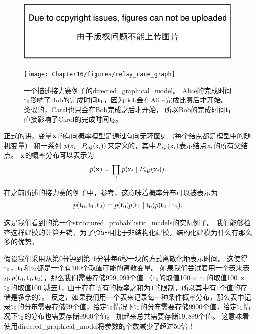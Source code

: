 \begin{figure}[!htb]
\ifOpenSource
\centerline{\includegraphics{figure.pdf}}
\else
\centerline{\texttt{[image: Chapter16/figures/relay\_race\_graph]}}	
\fi
\caption{一个描述接力赛例子的\gls{directed_graphical_model}。
Alice的完成时间$\mathrm{t}_0$影响了Bob的完成时间$\mathrm{t}_1$，因为Bob会在Alice完成比赛后才开始。
类似的，Carol也只会在Bob完成之后才开始，
所以Bob的完成时间$\mathrm{t}_1$直接影响了Carol的完成时间$\mathrm{t}_2$。}
\label{fig:relay_race_graph}
\end{figure}


正式的讲，变量$\mathbf{x}$的有向概率模型是通过有向无环图$\mathcal{G}$ （每个结点都是模型中的随机变量）
和一系列 $p(\mathrm{x}_i\mid P_{a\mathcal{G}}(\mathrm{x}_i))$来定义的，其中$P_{a\mathcal{G}}(\mathrm{x}_i)$表示结点$\mathrm{x}_i$的所有父结点。
$\mathbf{x}$的概率分布可以表示为
\begin{align}
\label{eqn:161}
p(\mathbf{x}) = \prod_{i} p(\mathrm{x}_i\mid P_{a\mathcal{G}}(\mathrm{x}_i)).
\end{align}


在之前所述的接力赛的例子中，参考，这意味着概率分布可以被表示为
\begin{align}
\label{eqn:162}
p(\mathrm{t}_0,\mathrm{t}_1,\mathrm{t}_2) = p(\mathrm{t}_0)p(\mathrm{t}_1\mid \mathrm{t}_0)p(\mathrm{t}_2\mid \mathrm{t}_1).
\end{align}


这是我们看到的第一个\gls{structured_probabilistic_models}的实际例子。
我们能够检查这样建模的计算开销，为了验证相比于非结构化建模，结构化建模为什么有那么多的优势。


假设我们采用从第$0$分钟到第$10$分钟每$6$秒一块的方式离散化地表示时间。
这使得$\mathrm{t}_0$，$\mathrm{t}_1$和$\mathrm{t}_2$都是一个有$100$个取值可能的离散变量。
如果我们尝试着用一个表来表示$p(\mathrm{t}_0, \mathrm{t}_1, \mathrm{t}_2)$，那么我们需要存储$999,999$个值
（$\mathrm{t}_0$的取值100 $\times$ $\mathrm{t}_1$的取值100 $\times$ $\mathrm{t}_2$的取值100 减去1，由于存在所有的概率之和为$1$的限制，所以其中有$1$个值的存储是多余的）。
反之，如果我们用一个表来记录每一种条件概率分布，那么表中记录$\mathrm{t}_0$的分布需要存储$99$个值，给定$\mathrm{t}_0$情况下$\mathrm{t}_1$的分布需要存储9900个值，给定$\mathrm{t}_1$情况下$\mathrm{t}_2$的分布也需要存储$9900$个值。
加起来总共需要存储$19, 899$个值。
这意味着使用\gls{directed_graphical_model}将参数的个数减少了超过$50$倍！


